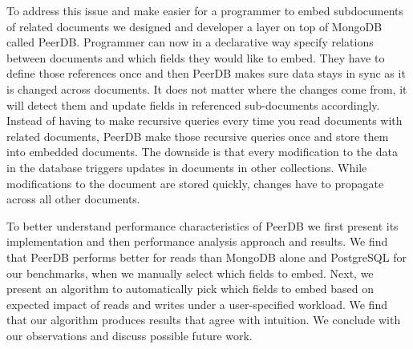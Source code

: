 To address this issue and make easier for a programmer to embed subdocuments of related documents we designed and developer a layer on top of MongoDB called PeerDB.
Programmer can now in a declarative way specify relations between documents and which fields they would like to embed.
They have to define those references once and then PeerDB makes sure data stays in sync as it is changed across documents.
It does not matter where the changes come from, it will detect them and update fields in referenced sub-documents accordingly.
Instead of having to make recursive queries every time you read documents with related documents, PeerDB make those recursive queries once and store them into embedded documents.
The downside is that every modification to the data in the database triggers updates in documents in other collections.
While modifications to the document are stored quickly, changes have to propagate across all other documents.

To better understand performance characteristics of PeerDB we first present its implementation and then performance analysis approach and results.
We find that PeerDB performs better for reads than MongoDB alone and PostgreSQL for our benchmarks, when we manually select which fields to embed. 
Next, we present an algorithm to automatically pick which fields to embed based on expected impact of reads and writes under a user-specified workload. 
We find that our algorithm produces results that agree with intuition.
We conclude with our observations and discuss possible future work.
